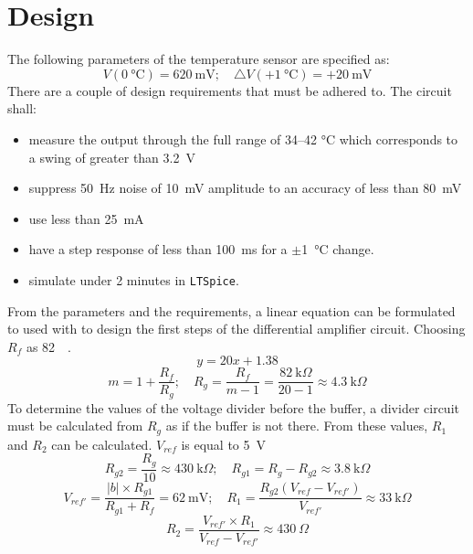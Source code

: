 \section{Design}\label{sec:temp_design_ch3}
The following parameters of the temperature sensor are specified as:\newline
\[V(\SI{0}{\celsius}) = \SI{620}{\milli\volt} ;\hspace{1em} \triangle V(+\SI{1}{\celsius}) = +\SI{20}{\milli\volt}\]
There are a couple of design requirements that must be adhered to. The circuit shall:
\begin{itemize}
\parsep
    \item measure the output through the full range of \numrange{34}{42} \si{\celsius} which corresponds to a swing of greater than \SI{3.2}{\volt}
    \item suppress \SI{50}{\hertz} noise of \SI{10}{\milli\volt} amplitude to an accuracy of less than \SI{80}{\milli\volt}
    \item use less than \SI{25}{\milli\ampere}
    \item have a step response of less than \SI{100}{\milli\second} for a $\pm$\SI{1}{\celsius} change.
    \item simulate under 2 minutes in \texttt{LTSpice}.
\end{itemize}
From the parameters and the requirements, a linear equation can be formulated to used with \cite{Carter2002} to design the first steps of the differential amplifier circuit. Choosing $R_f$ as \SI{82}{\kilo\Omega}.
\[y = 20x+1.38\]
\[m= 1+\frac{R_f}{R_g} ; \hspace{1em} R_g = \frac{R_f}{m-1} = \frac{\SI{82}{\kilo\Omega}}{20-1}\approx\SI{4.3}{\kilo\Omega} \]
To determine the values of the voltage divider before the buffer, a divider circuit must be calculated from $R_g$ as if the buffer is not there. From these values, $R_1$ and $R_2$ can be calculated. $V_{ref}$ is equal to \SI{5}{\volt}
\[R_{g2} = \frac{R_g}{10} \approx \SI{430}{\kilo\Omega}; \hspace{1em} R_{g1} = R_g - R_{g2}\approx\SI{3.8}{\kilo\Omega}\]
\[V_{ref'} = \frac{|b|\times R_{g1}}{R_{g1}+R_f} = \SI{62}{\milli\volt}; \hspace{1em} R_1 = \frac{R_{g2}(V_{ref}-V_{ref'})}{V_{ref'}} \approx \SI{33}{\kilo\Omega}\]
\[R_2=\frac{V_{ref'}\times R_1}{V_{ref}-V_{ref'}}\approx\SI{430}{\Omega}\]

